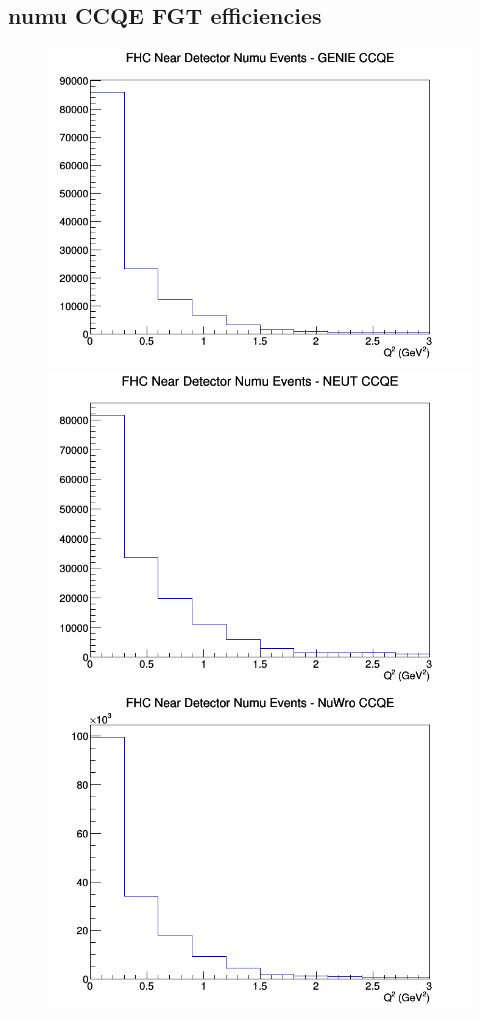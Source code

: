 \subsection{numu CCQE FGT efficiencies}
\begin{figure}[h]
\includegraphics[width=\linewidth]{eff_Q2/FGT/CCQE_FHC_ND_numu_Q2_GENIE.png}
\endminipage
{}
\includegraphics[width=\linewidth]{eff_Q2/FGT/CCQE_FHC_ND_numu_Q2_NEUT.png}
\endminipage
{}
\includegraphics[width=\linewidth]{eff_Q2/FGT/CCQE_FHC_ND_numu_Q2_NuWro.png}

\end{figure}
